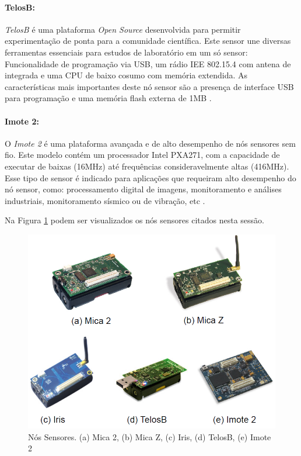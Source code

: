 \paragraph{TelosB:}
\emph{TelosB} é uma plataforma \emph{Open Source} desenvolvida para permitir experimentação de ponta para a comunidade científica. Este sensor une diversas ferramentas essenciais para estudos de laboratório em um só sensor: Funcionalidade de programação via USB, um rádio IEE 802.15.4 com antena de integrada e uma CPU de baixo cosumo com memória extendida.
As características mais importantes deste nó sensor são a presença de interface USB para programação e uma memória flash externa de 1MB \cite{TelosB}.

\paragraph{Imote 2:}
O \emph{Imote 2} é uma plataforma avançada e de alto desempenho de nós sensores sem fio. Este modelo contém um processador Intel PXA271, com a capacidade de executar de baixas (16MHz) até frequências consideravelmente altas (416MHz).
Esse tipo de sensor é indicado para aplicações que requeiram alto desempenho do nó sensor, como: processamento digital de imagens, monitoramento e análises industriais, monitoramento sísmico ou de vibração, etc \cite{Imote}.


Na Figura \ref{fig:nodes} podem ser visualizados os nós sensores citados nesta sessão.

\begin{figure}[h!]
\centering
\includegraphics[width=12cm]{pictures/sensor_nodes.png}
\caption{Nós Sensores. (a) Mica 2, (b) Mica Z, (c) Iris, (d) TelosB, (e) Imote 2}
 \label{fig:nodes}
\end{figure}